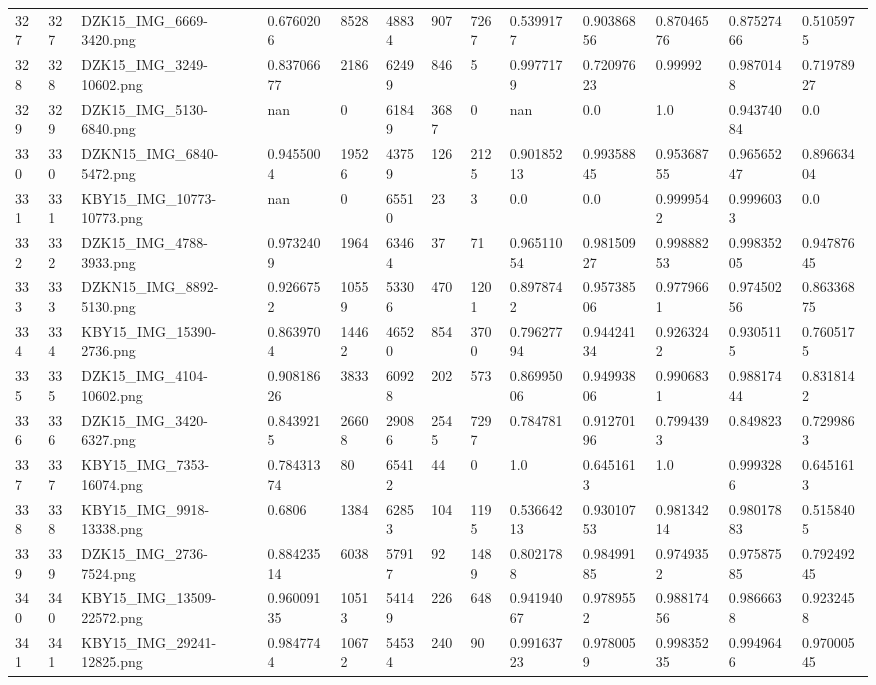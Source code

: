 \documentclass[11pt, a4paper, twoside]{report}
\begin{document}
\begin{longtable}[c]{@{}lllllllllllll@{}}
327 & 327 & DZK15\_IMG\_6669-3420.png & 0.6760206 & 8528 & 48834 & 907 & 7267 & 0.5399177 & 0.90386856 & 0.87046576 & 0.87527466 & 0.5105975 \\
328 & 328 & DZK15\_IMG\_3249-10602.png & 0.83706677 & 2186 & 62499 & 846 & 5 & 0.9977179 & 0.72097623 & 0.99992 & 0.9870148 & 0.71978927 \\
329 & 329 & DZK15\_IMG\_5130-6840.png & nan & 0 & 61849 & 3687 & 0 & nan & 0.0 & 1.0 & 0.94374084 & 0.0 \\
330 & 330 & DZKN15\_IMG\_6840-5472.png & 0.9455004 & 19526 & 43759 & 126 & 2125 & 0.90185213 & 0.99358845 & 0.95368755 & 0.96565247 & 0.89663404 \\
331 & 331 & KBY15\_IMG\_10773-10773.png & nan & 0 & 65510 & 23 & 3 & 0.0 & 0.0 & 0.9999542 & 0.9996033 & 0.0 \\
332 & 332 & DZK15\_IMG\_4788-3933.png & 0.9732409 & 1964 & 63464 & 37 & 71 & 0.96511054 & 0.98150927 & 0.99888253 & 0.99835205 & 0.94787645 \\
333 & 333 & DZKN15\_IMG\_8892-5130.png & 0.9266752 & 10559 & 53306 & 470 & 1201 & 0.8978742 & 0.95738506 & 0.9779661 & 0.97450256 & 0.86336875 \\
334 & 334 & KBY15\_IMG\_15390-2736.png & 0.8639704 & 14462 & 46520 & 854 & 3700 & 0.79627794 & 0.94424134 & 0.9263242 & 0.9305115 & 0.7605175 \\
335 & 335 & DZK15\_IMG\_4104-10602.png & 0.90818626 & 3833 & 60928 & 202 & 573 & 0.86995006 & 0.94993806 & 0.9906831 & 0.98817444 & 0.8318142 \\
336 & 336 & DZK15\_IMG\_3420-6327.png & 0.8439215 & 26608 & 29086 & 2545 & 7297 & 0.784781 & 0.91270196 & 0.7994393 & 0.849823 & 0.7299863 \\
337 & 337 & KBY15\_IMG\_7353-16074.png & 0.78431374 & 80 & 65412 & 44 & 0 & 1.0 & 0.6451613 & 1.0 & 0.9993286 & 0.6451613 \\
338 & 338 & KBY15\_IMG\_9918-13338.png & 0.6806 & 1384 & 62853 & 104 & 1195 & 0.53664213 & 0.93010753 & 0.98134214 & 0.98017883 & 0.5158405 \\
339 & 339 & DZK15\_IMG\_2736-7524.png & 0.88423514 & 6038 & 57917 & 92 & 1489 & 0.8021788 & 0.98499185 & 0.9749352 & 0.97587585 & 0.79249245 \\
340 & 340 & KBY15\_IMG\_13509-22572.png & 0.96009135 & 10513 & 54149 & 226 & 648 & 0.94194067 & 0.9789552 & 0.98817456 & 0.9866638 & 0.9232458 \\
341 & 341 & KBY15\_IMG\_29241-12825.png & 0.9847744 & 10672 & 54534 & 240 & 90 & 0.99163723 & 0.9780059 & 0.99835235 & 0.9949646 & 0.97000545 \\

\end{longtable}
\end{document}
